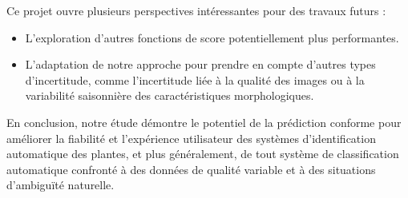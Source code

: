 \documentclass[a4paper,12pt]{article}
\begin{document}
\vspace{0.2cm}

Ce projet ouvre plusieurs perspectives intéressantes pour des travaux futurs :

\begin{itemize}
    \item L'exploration d'autres fonctions de score potentiellement plus performantes.
    \item L'adaptation de notre approche pour prendre en compte d'autres types d'incertitude, comme l'incertitude liée à la qualité des images ou à la variabilité saisonnière des caractéristiques morphologiques.
\end{itemize}

\vspace{0.2cm}

En conclusion, notre étude démontre le potentiel de la prédiction conforme pour améliorer la fiabilité et l'expérience utilisateur des systèmes d'identification automatique des plantes, et plus généralement, de tout système de classification automatique confronté à des données de qualité variable et à des situations d'ambiguïté naturelle.

\printbibliography
\end{document}
